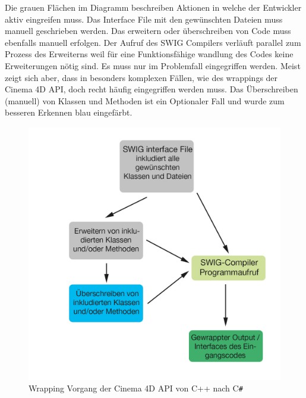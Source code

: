 \documentclass[pagesize, paper=a4, fontsize=12pt,titlepage=true, headings=small, headnosepline, abstractoff, liststotoc, nochapterprefix, plainheadsepline, twoside]{scrreprt}
\newcommand{\CS}{C\texttt{\#}}
\begin{document}
Die grauen Flächen im Diagramm beschreiben Aktionen in welche der Entwickler aktiv eingreifen muss. Das Interface File mit den gewünschten Dateien muss manuell geschrieben werden. Das erweitern oder überschreiben von Code muss ebenfalls manuell erfolgen. Der Aufruf des SWIG Compilers verläuft parallel zum Prozess des Erweiterns weil für eine Funktionsfähige wandlung des Codes keine Erweiterungen nötig sind. Es muss nur im Problemfall eingegriffen werden. Meist zeigt sich aber, dass in besonders komplexen Fällen, wie des wrappings der Cinema 4D API, doch recht häufig eingegriffen werden muss. Das Überschreiben (manuell) von Klassen und Methoden ist ein Optionaler Fall und wurde zum besseren Erkennen blau eingefärbt.
\begin{figure}[ht]
	\centering
	\includegraphics[width=\linewidth]{Bilder/swig_wrapping_csharp.jpg}
	\caption{Wrapping Vorgang der Cinema 4D API von C++ nach \CS}
	\label{SWIG wrapping Vorgang}
\end{figure}
\end{document}
